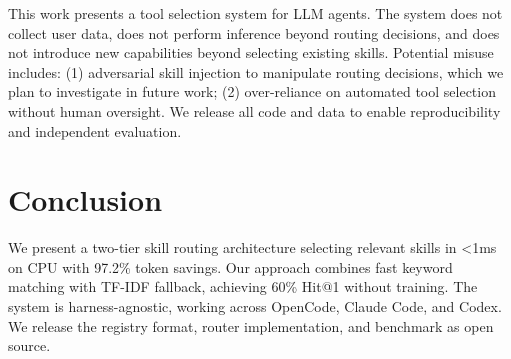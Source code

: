 \documentclass[11pt]{article}
\begin{document}
This work presents a tool selection system for LLM agents. The system does not collect user data, does not perform inference beyond routing decisions, and does not introduce new capabilities beyond selecting existing skills. Potential misuse includes: (1) adversarial skill injection to manipulate routing decisions, which we plan to investigate in future work; (2) over-reliance on automated tool selection without human oversight. We release all code and data to enable reproducibility and independent evaluation.

\section{Conclusion}

We present a two-tier skill routing architecture selecting relevant skills in <1ms on CPU with 97.2\% token savings. Our approach combines fast keyword matching with TF-IDF fallback, achieving 60\% Hit@1 without training. The system is harness-agnostic, working across OpenCode, Claude Code, and Codex. We release the registry format, router implementation, and benchmark as open source.
\end{document}
